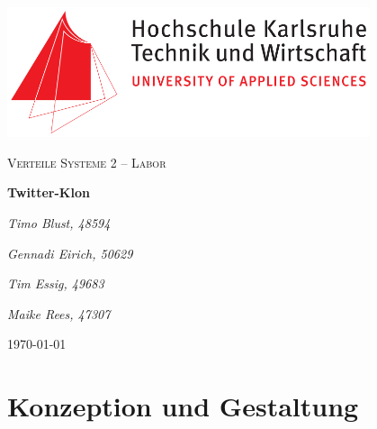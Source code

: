 \documentclass[
    a4paper
]{scrreprt}
\begin{document}
    \sffamily %


    \begin{titlepage}
        \centering
        \includegraphics[width=0.8\textwidth]{./images/logo_hska.png}\par\vspace{1cm}
        \vspace{1cm}

        {\scshape\Large Verteile Systeme 2 -- Labor\par}
        \vspace{1.5cm}

        {\huge\textbf{Twitter-Klon}\par}
        \vspace{2cm}

        {\Large\itshape Timo Blust, 48594\par}
        {\Large\itshape Gennadi Eirich, 50629\par}
        {\Large\itshape Tim Essig, 49683\par}
        {\Large\itshape Maike Rees, 47307\par}

        \vfill

        {\large \today\par}
    \end{titlepage}


    \tableofcontents


    \chapter{Konzeption und Gestaltung}
\end{document}

